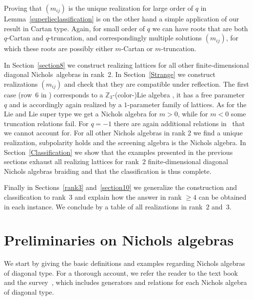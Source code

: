 \documentclass[10pt,a4paper]{amsart}
\numberwithin{equation}{section}
\newcommand{\Z}{\mathbb{Z}}
\begin{document}
Proving that $(m_{ij})$ is the unique realization for large order of $q$ in Lemma~\ref{superlieclassification} is on the other hand a simple application of our result in Cartan type. Again, for small order of $q$ we can have roots that are both $q$-Cartan and $q$-truncation, and correspondingly multiple solutions $(m_{ij})$, for which these roots are possibly either $m$-Cartan or $m$-truncation.

In Section~\ref{section8} we construct realizing lattices for all other finite-dimensional diagonal Nichols~algebras in rank~2. In Section~\ref{Strange} we construct realizations $(m_{ij})$ and check that they are compatible under reflection. The first case (row~6 in \cite[Table~1]{Hecklist}) corresponds to a $\Z_3$-(co\-lor-)Lie algebra \cite{AAB14, Yam07}, it has a free parameter~$q$ and is accordingly again realized by a $1$-parameter family of lattices. As for the Lie and Lie super type we get a Nichols algebra for $m>0$, while for $m<0$ some truncation relations fail. For $q=-1$ there are again additional relations in~\cite{AA17} that we cannot account for. For all other Nichols algebras in rank 2 we find a unique realization, subpolarity holds and the screening algebra is the Nichols algebra.
In Section~\ref{Classification} we show that the examples presented in the previous sections
exhaust all realizing lattices for rank~2 finite-dimensional diagonal
Nichols algebras braiding and that the classification is thus complete.

Finally in Sections~\ref{rank3} and~\ref{section10} we generalize the construction and classification to rank~3 and explain how the answer in rank $\geq 4$ can be obtained in each instance. We conclude by a table of all realizations in rank~$2$ and~$3$.

\section{Preliminaries on Nichols algebras}\label{section2}
We start by giving the basic definitions and examples regarding Nichols algebras of diagonal type. For a thorough account, we refer the reader to the text book~\cite{HS20} and the survey~\cite{AA17}, which includes generators and relations for each Nichols algebra of diagonal type.
\end{document}
